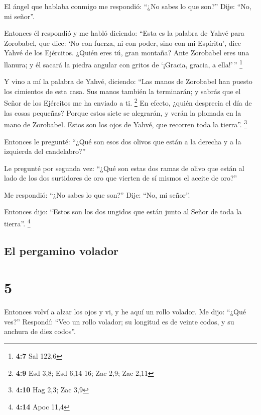  El ángel que hablaba conmigo me respondió: ``¿No sabes lo
que son?'' Dije: ``No, mi señor''.

 Entonces él respondió y me habló diciendo: ``Esta es la
palabra de Yahvé para Zorobabel, que dice: `No con fuerza, ni con poder,
sino con mi Espíritu', dice Yahvé de los Ejércitos. 
¿Quién eres tú, gran montaña? Ante Zorobabel eres una llanura; y él
sacará la piedra angular con gritos de `¡Gracia, gracia, a ella!'\,''
\footnote{\textbf{4:7} Sal 122,6}

 Y vino a mí la palabra de Yahvé, diciendo: 
``Las manos de Zorobabel han puesto los cimientos de esta casa. Sus
manos también la terminarán; y sabrás que el Señor de los Ejércitos me
ha enviado a ti. \footnote{\textbf{4:9} Esd 3,8; Esd 6,14-16; Zac 2,9;
  Zac 2,11}  En efecto, ¿quién desprecia el día de las
cosas pequeñas? Porque estos siete se alegrarán, y verán la plomada en
la mano de Zorobabel. Estos son los ojos de Yahvé, que recorren toda la
tierra''. \footnote{\textbf{4:10} Hag 2,3; Zac 3,9}

 Entonces le pregunté: ``¿Qué son esos dos olivos que
están a la derecha y a la izquierda del candelabro?''

 Le pregunté por segunda vez: ``¿Qué son estas dos ramas
de olivo que están al lado de los dos surtidores de oro que vierten de
sí mismos el aceite de oro?''

 Me respondió: ``¿No sabes lo que son?'' Dije: ``No, mi
señor''.

 Entonces dijo: ``Estos son los dos ungidos que están
junto al Señor de toda la tierra''. \footnote{\textbf{4:14} Apoc 11,4}

\hypertarget{el-pergamino-volador}{%
\subsection{El pergamino volador}\label{el-pergamino-volador}}

\hypertarget{section-4}{%
\section{5}\label{section-4}}

 Entonces volví a alzar los ojos y vi, y he aquí un rollo
volador.  Me dijo: ``¿Qué ves?'' Respondí: ``Veo un rollo
volador; su longitud es de veinte codos, y su anchura de diez codos''.

